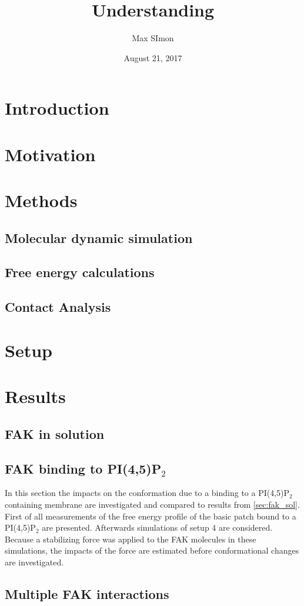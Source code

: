 \documentclass[
11pt, %
parskip=half, %
digital, %
oneside, %
]{bsc}
\title{Understanding}
\author{Max SImon}
\date{August 21, 2017}
\newcommand{\pip}{PI(4,5)P$_2$}
\begin{document}
	
\chapter{Introduction}

\chapter{Motivation}

\chapter{Methods}
\section{Molecular dynamic simulation}

\section{Free energy calculations}

\section{Contact Analysis}

\chapter{Setup}

\chapter{Results}
\section{FAK in solution}

\section{FAK binding to \pip{}}
In this section the impacts on the conformation due to a binding to a \pip{} containing membrane are investigated and compared to results from \autoref{sec:fak_sol}.\\
First of all measurements of the free energy profile of the basic patch bound to a \pip{} are presented. Afterwards simulations of setup 4 are considered. Because a stabilizing force was applied to the FAK molecules in these simulations, the impacts of the force are estimated before conformational changes are investigated.



\section{Multiple FAK interactions}

\end{document}
